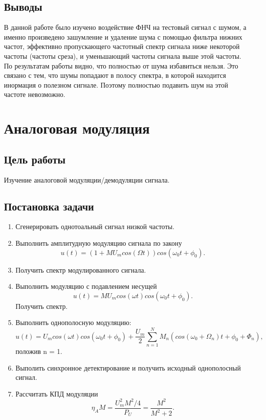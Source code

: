 \documentclass[10pt,a4paper]{article}
\begin{document}
\FloatBarrier

\subsection{Выводы}
В данной работе было изучено воздействие ФНЧ на тестовый сигнал с шумом, а именно произведено зашумление и удаление шума с помощью фильтра нижних частот, эффективно пропускающего частотный спектр сигнала ниже некоторой частоты (частоты среза), и уменьшающий частоты сигнала выше этой частоты. По результатам работы видно, что полностью от шума избавиться нельзя. Это связано с тем, что шумы попадают в полосу спектра, в которой находится инормация о полезном сигнале. Поэтому полностью подавить шум на этой частоте невозможно.

\newpage
\section{Аналоговая модуляция}

\subsection{Цель работы}
Изучение аналоговой модуляции/демодуляции сигнала.

\subsection{Постановка задачи}
	\begin{enumerate}
		\item Сгенерировать однотоальный сигнал низкой частоты.
		\item Выполнить амплитудную модуляцию сигнала по закону
				\begin{equation}
					u(t) = (1+MU_m cos(\Omega t))cos(\omega_0 t+\phi_0).
				\end{equation}
		\item Получить спектр модулированного сигнала.
		\item Выполнить модуляцию с подавлением несущей 
				\begin{equation}
					u(t) = MU_m cos(\omega t)cos(\omega_0 t+\phi_0).
				\end{equation}
		      Получить спектр. 
		\item Выполнить однополосную модуляцию:
				\begin{equation}
					u(t) = U_m cos(\omega t)cos(\omega_0 t+\phi_0)+\frac{U_m}{2}\sum_{n=1}^N M_n (cos(\omega_0 + \Omega_n )t + \phi_0 + \Phi_n ),
				\end{equation}
				положив n = 1.
		\item Выполить синхронное детектирование и получить исходный однополосный сигнал.
		\item Рассчитать КПД модуляции
				\begin{equation}
					\eta_A M = \frac{U_m ^2 M^2 /4}{P_U} = \frac{M^2}{M^2 + 2}.
				\end{equation}
	\end{enumerate}
\end{document}
